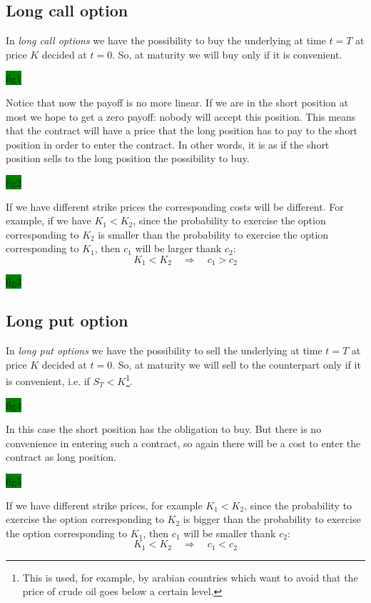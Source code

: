 \subsection{Long call option}
In \emph{long call options} we have the possibility to buy the underlying at time $t=T$ at price $K$ decided at $t=0$. So, at maturity we will buy only if it is convenient. 
\begin{center}
    \colorbox{green}{fig1}
\end{center}
Notice that now the payoff is no more linear. If we are in the short position at most we hope to get a zero payoff: nobody will accept this position. This means that the contract will have a price that the long position has to pay to the short position in order to enter the contract. In other words, it is as if the short position sells to the long position the possibility to buy.
\begin{center}
    \colorbox{green}{fig2}
\end{center}
If we have different strike prices the corresponding costs will be different. For example, if we have $K_1<K_2$, since the probability to exercise the option corresponding to $K_2$ is smaller than the probability to exercise the option corresponding to $K_1$, then $c_1$ will be larger thank $c_2$: 
\begin{equation*}
    K_1 < K_2 \quad\Rightarrow\quad c_1 > c_2
\end{equation*}
\begin{center}
    \colorbox{green}{fig3}
\end{center}

\subsection{Long put option}
In \emph{long put options} we have the possibility to sell the underlying at time $t=T$ at price $K$ decided at $t=0$. So, at maturity we will sell to the counterpart only if it is convenient, i.e. if $S_T<K$\footnote{This is used, for example, by arabian countries which want to avoid that the price of crude oil goes below a certain level.}.
\begin{center}
    \colorbox{green}{fig4}
\end{center}
In this case the short position has the obligation to buy. But there is no convenience in entering such a contract, so again there will be a cost to enter the contract as long position.
\begin{center}
    \colorbox{green}{fig5}
\end{center}
If we have different strike prices, for example $K_1<K_2$, since the probability to exercise the option corresponding to $K_2$ is bigger than the probability to exercise the option corresponding to $K_1$, then $c_1$ will be smaller thank $c_2$: 
\begin{equation*}
    K_1 < K_2 \quad\Rightarrow\quad c_1 < c_2
\end{equation*}